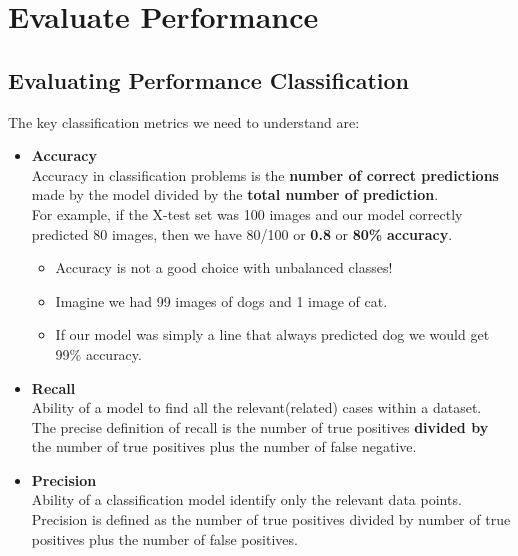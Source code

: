 \documentclass[12pt]{article}
\begin{document}
\section{Evaluate Performance}
\subsection{Evaluating Performance Classification}

The key classification metrics we need to understand are:
\begin{itemize}
	\item
	\textbf{Accuracy}\\
		Accuracy in classification problems is the \textbf{number of correct predictions} made by the model divided by the \textbf{total number of prediction}.\\
		For example, if the X-test set was 100 images and our model correctly predicted 80 images, then we have 80/100 or \textbf{0.8} or \textbf{80\%}\textbf{ accuracy}.
	
	\begin{itemize}
		\item
		Accuracy is not a good choice with unbalanced classes!
		\item
		Imagine we had 99 images of dogs and 1 image of cat.
		\item
		If our model was simply a line that always predicted dog we would get 99\% accuracy.
	\end{itemize}
		
	\item
	\textbf{Recall}\\
		Ability of a model to find all the relevant(related) cases within a dataset.\\
		The precise definition of recall is the number of true positives \textbf{divided by} the number of true positives plus the number of false negative.
	\item
	\textbf{Precision}\\
	Ability of a classification model identify only the relevant data points.\\
	Precision is defined as the number of true positives divided by number of true positives plus the number of false positives.
	

\end{itemize}
\end{document}
